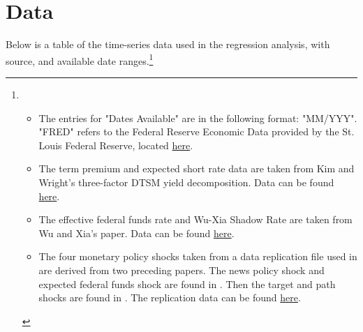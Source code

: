 \documentclass[12pt,final]{article}
\begin{document}
\section{Data}
Below is a table of the time-series data used in the regression analysis, with source, and available date ranges.\footnote{
\vspace{-0.1in}
\begin{itemize}
\itemsep-0.5em 
	\item The entries for "Dates Available" are in the following format: "MM/YYY". \\
"FRED" refers to the Federal Reserve Economic Data provided by the St. Louis Federal Reserve, located \href{https://fred.stlouisfed.org/}{here}.
	\item The term premium and expected short rate data are taken from Kim and Wright's three-factor DTSM yield decomposition. \citep{Kim2005} Data can be found \href{https://www.federalreserve.gov/data/three-factor-nominal-term-structure-model.htm}{here}.
	\item The effective federal funds rate and Wu-Xia Shadow Rate are taken from Wu and Xia's paper. \citep{Wu2016} Data can be found \href{https://www.atlantafed.org/cqer/research/wu-xia-shadow-federal-funds-rate}{here}.
	\item The four monetary policy shocks taken from a data replication file used in \citep{Acosta2022} are derived from two preceding papers. The news policy shock and expected federal funds shock are found in \citep{Nakamura2018}. Then the target and path shocks are found in \citep{Guerkaynak2005}. The replication data can be found \href{https://www.acostamiguel.com/research.html}{here}.
\end{itemize}}
\end{document}
